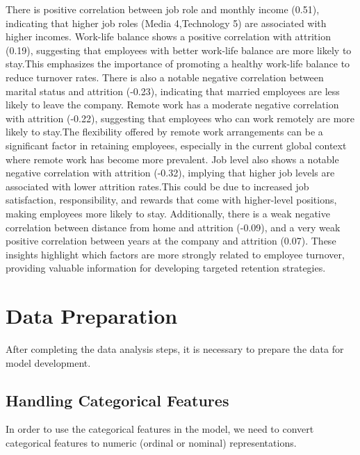 \documentclass[
  10pt,
  paper=a4,
  ,captions=tableheading
]{scrartcl}
\begin{document}
\small

There is positive correlation between job role and monthly income
(0.51), indicating that higher job roles (Media 4,Technology 5) are
associated with higher incomes. Work-life balance shows a positive
correlation with attrition (0.19), suggesting that employees with better
work-life balance are more likely to stay.This emphasizes the importance
of promoting a healthy work-life balance to reduce turnover rates. There
is also a notable negative correlation between marital status and
attrition (-0.23), indicating that married employees are less likely to
leave the company. Remote work has a moderate negative correlation with
attrition (-0.22), suggesting that employees who can work remotely are
more likely to stay.The flexibility offered by remote work arrangements
can be a significant factor in retaining employees, especially in the
current global context where remote work has become more prevalent. Job
level also shows a notable negative correlation with attrition (-0.32),
implying that higher job levels are associated with lower attrition
rates.This could be due to increased job satisfaction, responsibility,
and rewards that come with higher-level positions, making employees more
likely to stay. Additionally, there is a weak negative correlation
between distance from home and attrition (-0.09), and a very weak
positive correlation between years at the company and attrition (0.07).
These insights highlight which factors are more strongly related to
employee turnover, providing valuable information for developing
targeted retention strategies.

\section{Data Preparation}\label{data-preparation}

After completing the data analysis steps, it is necessary to prepare the
data for model development.

\subsection{Handling Categorical
Features}\label{handling-categorical-features}

In order to use the categorical features in the model, we need to
convert categorical features to numeric (ordinal or nominal)
representations.

\small
\end{document}
